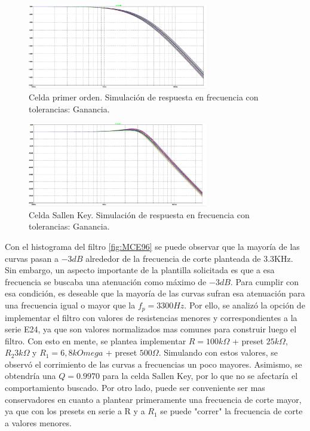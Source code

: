 \begin{figure}[H]
    \centering
    \includegraphics[width= 0.7\textwidth]{../Ejercicio2-DisenoDeCeldas/1CeldaSallenKey/images/MAG1stOrder.png}
    \caption{Celda primer orden. Simulación de respuesta en frecuencia con tolerancias: Ganancia.}
    \label{fig:1LPsimugain}
\end{figure}

\begin{figure}[H]
    \centering
        \includegraphics[width= 0.7\textwidth]{../Ejercicio2-DisenoDeCeldas/1CeldaSallenKey/images/SKsimu.png}
    \caption{Celda Sallen Key. Simulación de respuesta en frecuencia con tolerancias: Ganancia.}
    \label{fig:SKsimugain}
\end{figure}

Con el histograma del filtro \ref{fig:MCE96} se puede observar que la mayoría de las curvas pasan a $-3dB$ alrededor de la frecuencia de corte planteada de 3.3KHz. Sin embargo, un aspecto importante de la plantilla solicitada es que a esa frecuencia se buscaba una atenuación como máximo de $-3dB$. Para cumplir con esa condición, es deseable que la mayoría de las curvas sufran esa atenuación para una frecuencia igual o mayor que la $f_{p} = 3300Hz$. Por ello, se analizó la opción de implementar el filtro con valores de resistencias menores y correspondientes a la serie E24, ya que son valores normalizados mas comunes para construir luego el filtro. Con esto en mente, se plantea implementar $R=100k\Omega$ + preset $25k\Omega$, $R_{2}3k\Omega$ y $R_{1}=6,8kOmega$ + preset $500\Omega$. Simulando con estos valores, se observó el corrimiento de las curvas a frecuencias un poco mayores. Asimismo, se obtendría una $Q = 0.9970$ para la celda Sallen Key, por lo que no se afectaría el comportamiento buscado. Por otro lado, puede ser conveniente ser mas conservadores en cuanto a plantear primeramente una frecuencia de corte mayor, ya que con los presets en serie a R y a $R_{1}$ se puede "correr" la frecuencia de corte a valores menores. 

